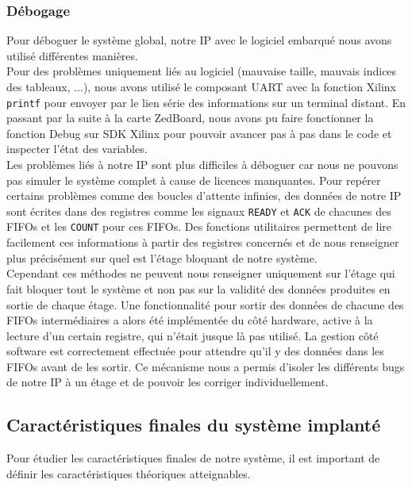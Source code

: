 \subsubsection{Débogage}
Pour déboguer le système global, notre IP avec le logiciel embarqué nous avons
utilisé différentes manières. \\
Pour des problèmes uniquement liés au logiciel (mauvaise taille, mauvais indices
des tableaux, ...),
nous avons utilisé le composant
UART avec la fonction Xilinx \texttt{printf} pour envoyer par le lien série des
informations sur un terminal distant. En passant par la suite à la carte ZedBoard,
nous avons pu faire fonctionner la fonction Debug sur SDK Xilinx pour pouvoir
avancer pas à pas dans le code et inspecter l'état des variables. \\
Les problèmes liés à notre IP sont plus difficiles à déboguer car nous ne pouvons
pas simuler le système complet à cause de licences manquantes. Pour repérer
certains problèmes comme des boucles d'attente infinies, des données de
notre IP sont écrites dans des registres comme les signaux \texttt{READY} et
\texttt{ACK} de chacunes des FIFOs et les \texttt{COUNT} pour ces FIFOs. Des
fonctions utilitaires permettent de lire facilement ces informations à partir
des registres concernés et de nous renseigner plus précisément sur quel est
l'étage bloquant de notre système. \\
Cependant ces méthodes ne peuvent nous renseigner uniquement sur l'étage qui
fait bloquer tout le système et non pas sur la validité des données produites
en sortie de chaque étage. Une fonctionnalité pour sortir des données de chacune
des FIFOs intermédiaires a alors été implémentée du côté hardware, active à la
lecture d'un certain registre, qui n'était jusque là pas utilisé. La gestion
côté software est correctement effectuée pour attendre qu'il y des données dans
les FIFOs avant de les sortir. Ce mécanisme nous a permis d'isoler les différents
bugs de notre IP à un étage et de pouvoir les corriger individuellement.

\subsection{Caractéristiques finales du système implanté}
Pour étudier les caractéristiques finales de notre système, il est important
de définir les caractéristiques théoriques atteignables.

